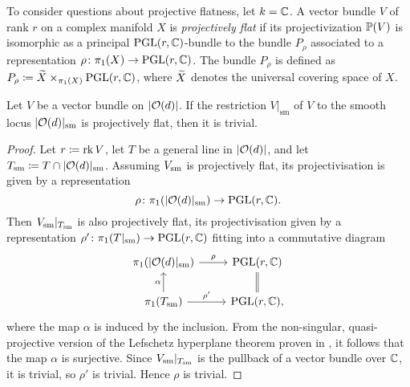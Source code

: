 To consider questions about projective flatness, let $k=\mathbb{C}$. A vector bundle $V$ of rank $r$ on a complex manifold $X$ is \emph{projectively flat} if its projectivization $\mathbb{P}(V)$ is isomorphic as a principal $\operatorname {PGL}(r,\mathbb{C})$-bundle to the bundle $P_{\rho}$ associated to a representation $\rho\colon\pi_1{(X)}\to \operatorname {PGL}(r,\mathbb{C})$. The bundle $P_{\rho}$ is defined as $P_{\rho}\coloneqq \widetilde X \times_{\pi_1(X)} \operatorname {PGL}(r,\mathbb{C})$, where $\widetilde X$ denotes the universal covering space of $X$.


\begin{proposition}
	Let $V$ be a vector bundle on $\lvert\mathcal{O}(d)\rvert$. If the restriction $V|_{\mathrm{sm}}$ of $V$ to the smooth locus $\lvert\mathcal{O}(d)\rvert_{\mathrm{sm}}$ is projectively flat, then it is trivial.
\end{proposition}


\begin{proof}
	Let $r\coloneqq \operatorname{rk} V$, let $T$ be a general line in $\lvert\mathcal{O}(d)\rvert$, and let $T_{\mathrm{sm}}\coloneqq T \cap \lvert\mathcal{O}(d)\rvert_{\text{sm}}$. Assuming $V_{\text{sm}}$ is projectively flat, its projectivisation is given by a representation
	$$\rho\colon \pi_1(\lvert\mathcal{O}(d)\rvert_{\text{sm}})\to \operatorname {PGL}(r,\mathbb{C}).$$
	Then $V_{\text{sm}}|_{T_{\text{sm}}}$ is also projectively flat, its projectivisation given by a representation $\rho'\colon \pi_1(T|_{\text{sm}}) \to \operatorname {PGL}(r,\mathbb{C})$ fitting into a commutative diagram
	\[
	\begin{tikzcd}
		\pi_1(\schemeofsurfaces_\sm) \arrow{r}{\rho} & \PGL(r,\CC) \\
		\pi_1(T_{\sm}) \arrow{u}{\alpha} \arrow{r}{\rho'} & \PGL(r,\CC), \arrow[u,equal]
	\end{tikzcd}
	\]
	where the map $\alpha$ is induced by the inclusion. From the non-singular, quasi-projective version of the Lefschetz hyperplane theorem proven in \cite{lefschetz-theorem-quasiprojective}, it follows that the map $\alpha$ is surjective. Since $V_{\text{sm}}|_{T_{\text{sm}}}$ is the pullback of a vector bundle over
	$\mathbb{C}$, it is trivial, so $\rho'$ is trivial. Hence $\rho$ is trivial. 
\end{proof}		

